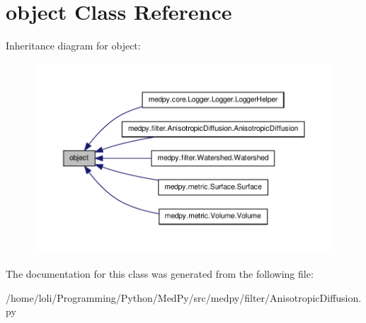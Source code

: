 \hypertarget{classobject}{
\section{object Class Reference}
\label{classobject}
}


Inheritance diagram for object:\nopagebreak
\begin{figure}[H]
\begin{center}
\leavevmode
\includegraphics[width=400pt]{classobject__inherit__graph}
\end{center}
\end{figure}


The documentation for this class was generated from the following file:\begin{DoxyCompactItemize}
\item 
/home/loli/Programming/Python/MedPy/src/medpy/filter/AnisotropicDiffusion.py\end{DoxyCompactItemize}
